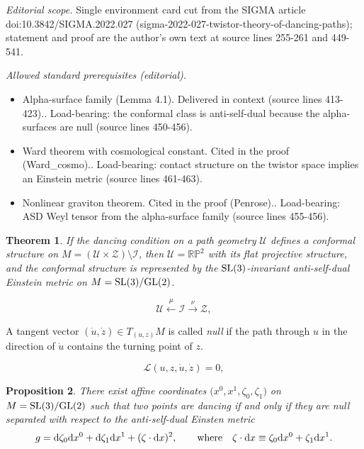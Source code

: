 \documentclass[10pt,a4paper]{article}
\numberwithin{equation}{section}
\newtheorem{Theorem}{Theorem}[section]
\newtheorem{Proposition}[Theorem]{Proposition}
{ \theoremstyle{definition}
\newtheorem{Definition}[Theorem]{Definition}
\newtheorem{Example}[Theorem]{Example}
\newtheorem{Remark}[Theorem]{Remark} }
\newcommand{\Z}{\mathbb{Z}}
\newcommand{\RP}{\mathbb{RP}}
\def\be{\begin{equation}}
\def\ee{\end{equation}}
\renewcommand{\Z}{\mathcal{Z}}
\newcommand{\U}{\mathcal{U}}
\begin{document}
\noindent\textit{Editorial scope.} Single environment card cut from the SIGMA article doi:10.3842/SIGMA.2022.027 (sigma-2022-027-twistor-theory-of-dancing-paths); statement and proof are the author's own text at source lines 255-261 and 449-541.\par\medskip
\noindent\textit{Allowed standard prerequisites (editorial).}\begin{itemize}
\item Alpha-surface family (Lemma 4.1). Delivered in context (source lines 413-423).. Load-bearing: the conformal class is anti-self-dual because the alpha-surfaces are null (source lines 450-456).
\item Ward theorem with cosmological constant. Cited in the proof (Ward\_cosmo).. Load-bearing: contact structure on the twistor space implies an Einstein metric (source lines 461-463).
\item Nonlinear graviton theorem. Cited in the proof (Penrose).. Load-bearing: ASD Weyl tensor from the alpha-surface family (source lines 455-456).
\end{itemize}\medskip
\begin{Theorem}
\label{theo_rigid}
If the dancing condition on a path geometry $\U$ defines a conformal structure
on $M=(\U\times \Z)\setminus {\mathcal I}$, then $\U=\RP^2$ with its flat projective
structure, and the conformal structure is represented by the
${\rm SL}(3)$-invariant anti-self-dual Einstein metric on $M={\rm SL}(3)/{\rm GL}(2)$.
\end{Theorem}

\be\label{double_fib}
\U\stackrel{\mu}\longleftarrow
{\mathcal I}\stackrel{\nu}\longrightarrow {\Z},
\ee

\begin{Definition}
\label{definull}
A tangent vector $(\dot{u}, \dot{z})\in T_{(u, z)}M$
is called
{\em null} if the path through $u$ in the direction of $\dot{u}$ contains the turning point of $z$.
\end{Definition}

\be
\label{lagrangian}
{\mathcal L}(u, z, \dot{u}, \dot{z})=0,
\ee

\begin{Proposition}
There exist affine coordinates $\big(x^0, x^1, \zeta_0, \zeta_1\big)$
on $M={\rm SL}(3)/{\rm GL}(2)$ such that two points are dancing if and only if they are null separated
with respect to the anti-self-dual Einsten metric
\be
\label{affine_c}
g={\rm d}\zeta_0{\rm d}x^0+{\rm d}\zeta_1 {\rm d}x^1+(\zeta\cdot {\rm d}x)^2, \qquad \text{where}\quad
\zeta\cdot {\rm d}x\equiv
\zeta_0 {\rm d}x^0+\zeta_1 {\rm d}x^1.
\ee
\end{Proposition}
\end{document}
